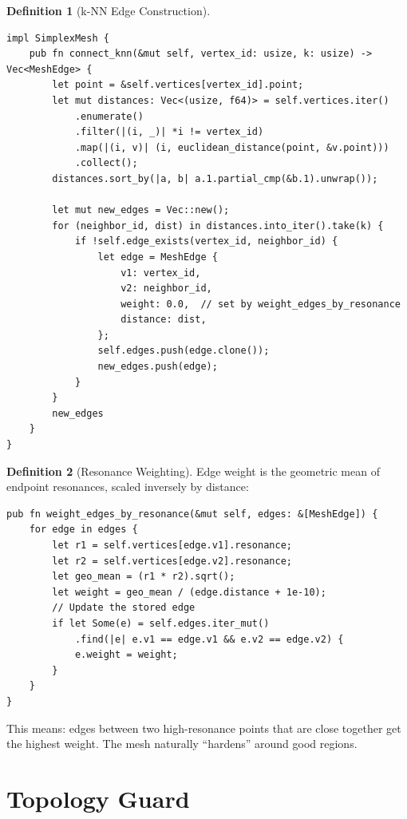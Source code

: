 \documentclass[11pt,a4paper,twoside]{article}
\theoremstyle{definition}
\newtheorem{definition}{Definition}[section]
\theoremstyle{plain}
\theoremstyle{remark}
\begin{document}
\begin{definition}[k-NN Edge Construction]\label{def:knn}
\begin{lstlisting}
impl SimplexMesh {
    pub fn connect_knn(&mut self, vertex_id: usize, k: usize) -> Vec<MeshEdge> {
        let point = &self.vertices[vertex_id].point;
        let mut distances: Vec<(usize, f64)> = self.vertices.iter()
            .enumerate()
            .filter(|(i, _)| *i != vertex_id)
            .map(|(i, v)| (i, euclidean_distance(point, &v.point)))
            .collect();
        distances.sort_by(|a, b| a.1.partial_cmp(&b.1).unwrap());

        let mut new_edges = Vec::new();
        for (neighbor_id, dist) in distances.into_iter().take(k) {
            if !self.edge_exists(vertex_id, neighbor_id) {
                let edge = MeshEdge {
                    v1: vertex_id,
                    v2: neighbor_id,
                    weight: 0.0,  // set by weight_edges_by_resonance
                    distance: dist,
                };
                self.edges.push(edge.clone());
                new_edges.push(edge);
            }
        }
        new_edges
    }
}
\end{lstlisting}
\end{definition}

\begin{definition}[Resonance Weighting]\label{def:resweight}
Edge weight is the geometric mean of endpoint resonances, scaled
inversely by distance:
\begin{lstlisting}
pub fn weight_edges_by_resonance(&mut self, edges: &[MeshEdge]) {
    for edge in edges {
        let r1 = self.vertices[edge.v1].resonance;
        let r2 = self.vertices[edge.v2].resonance;
        let geo_mean = (r1 * r2).sqrt();
        let weight = geo_mean / (edge.distance + 1e-10);
        // Update the stored edge
        if let Some(e) = self.edges.iter_mut()
            .find(|e| e.v1 == edge.v1 && e.v2 == edge.v2) {
            e.weight = weight;
        }
    }
}
\end{lstlisting}
This means: edges between two high-resonance points that are close
together get the highest weight. The mesh naturally ``hardens''
around good regions.
\end{definition}


\section{Topology Guard}\label{sec:topo}
\end{document}
